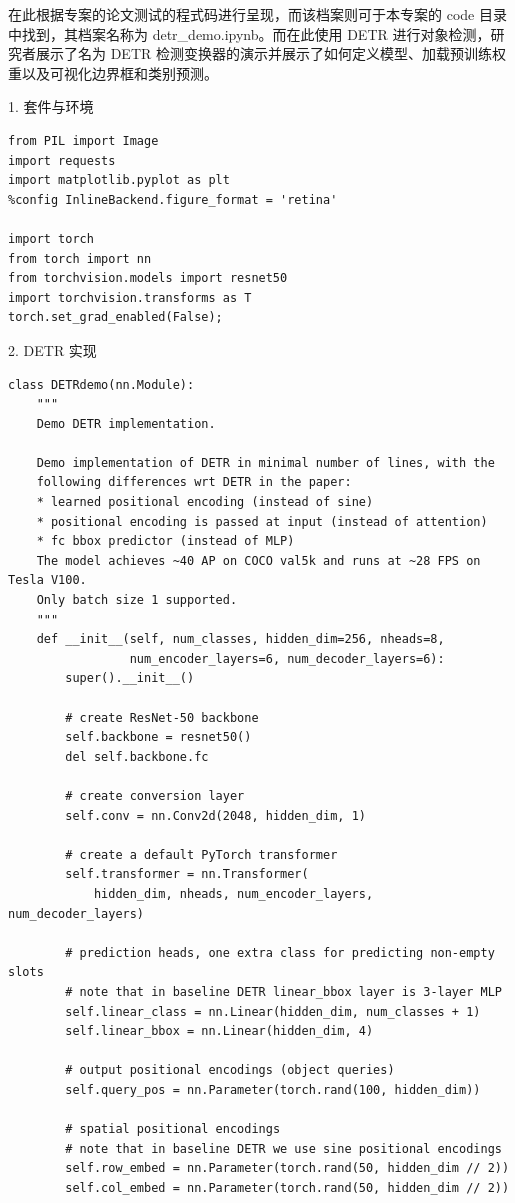 在此根据专案的论文测试的程式码进行呈现，而该档案则可于本专案的 code 目录中找到，其档案名称为 detr\_demo.ipynb。而在此使用 DETR 进行对象检测，研究者展示了名为 DETR 检测变换器的演示并展示了如何定义模型、加载预训练权重以及可视化边界框和类别预测。

1. 套件与环境

\begin{Verbatim}
from PIL import Image
import requests
import matplotlib.pyplot as plt
%config InlineBackend.figure_format = 'retina'

import torch
from torch import nn
from torchvision.models import resnet50
import torchvision.transforms as T
torch.set_grad_enabled(False);
\end{Verbatim}

2. DETR 实现

\begin{Verbatim}
class DETRdemo(nn.Module):
    """
    Demo DETR implementation.

    Demo implementation of DETR in minimal number of lines, with the
    following differences wrt DETR in the paper:
    * learned positional encoding (instead of sine)
    * positional encoding is passed at input (instead of attention)
    * fc bbox predictor (instead of MLP)
    The model achieves ~40 AP on COCO val5k and runs at ~28 FPS on Tesla V100.
    Only batch size 1 supported.
    """
    def __init__(self, num_classes, hidden_dim=256, nheads=8,
                 num_encoder_layers=6, num_decoder_layers=6):
        super().__init__()

        # create ResNet-50 backbone
        self.backbone = resnet50()
        del self.backbone.fc

        # create conversion layer
        self.conv = nn.Conv2d(2048, hidden_dim, 1)

        # create a default PyTorch transformer
        self.transformer = nn.Transformer(
            hidden_dim, nheads, num_encoder_layers, num_decoder_layers)

        # prediction heads, one extra class for predicting non-empty slots
        # note that in baseline DETR linear_bbox layer is 3-layer MLP
        self.linear_class = nn.Linear(hidden_dim, num_classes + 1)
        self.linear_bbox = nn.Linear(hidden_dim, 4)

        # output positional encodings (object queries)
        self.query_pos = nn.Parameter(torch.rand(100, hidden_dim))

        # spatial positional encodings
        # note that in baseline DETR we use sine positional encodings
        self.row_embed = nn.Parameter(torch.rand(50, hidden_dim // 2))
        self.col_embed = nn.Parameter(torch.rand(50, hidden_dim // 2))


\end{Verbatim}
